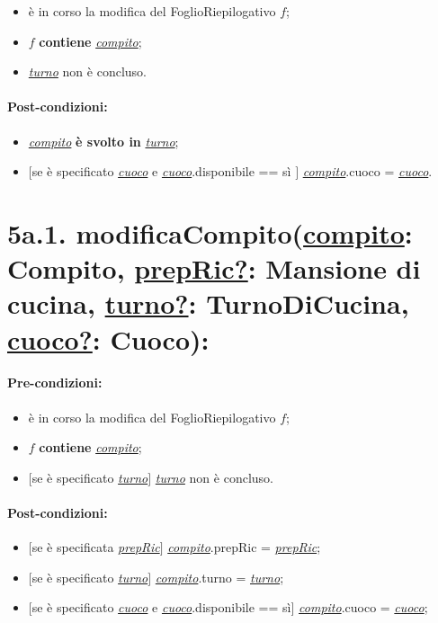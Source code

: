 \begin{itemize}
  \item è in corso la modifica del FoglioRiepilogativo $f$;
  \item $f$ \textbf{contiene} \underline{\textit{compito}};
  \item \underline{\textit{turno}} non è concluso.
\end{itemize}

\paragraph{Post-condizioni:}

\begin{itemize}
  \item \underline{\textit{compito}} \textbf{è svolto in} \underline{\textit{turno}};
  \item $[$se è specificato \underline{\textit{cuoco}} e \underline{\textit{cuoco}}.disponibile == sì $]$ \underline{\textit{compito}}.cuoco = \underline{\textit{cuoco}}.
\end{itemize}

\section*{5a.1. modificaCompito(\underline{compito}: Compito, \underline{prepRic?}: Mansione di cucina, \underline{turno?}: TurnoDiCucina, \underline{cuoco?}: Cuoco):}

\paragraph{Pre-condizioni:}

\begin{itemize}
  \item è in corso la modifica del FoglioRiepilogativo $f$;
  \item $f$ \textbf{contiene} \underline{\textit{compito}};
  \item $[$se è specificato \underline{\textit{turno}}$]$ \underline{\textit{turno}} non è concluso.
\end{itemize}

\paragraph{Post-condizioni:}

\begin{itemize}
  \item $[$se è specificata \underline{\textit{prepRic}}$]$ \underline{\textit{compito}}.prepRic = \underline{\textit{prepRic}};
  \item $[$se è specificato \underline{\textit{turno}}$]$ \underline{\textit{compito}}.turno = \underline{\textit{turno}};
  \item $[$se è specificato \underline{\textit{cuoco}} e \underline{\textit{cuoco}}.disponibile == sì$]$ \underline{\textit{compito}}.cuoco = \underline{\textit{cuoco}};
\end{itemize}

